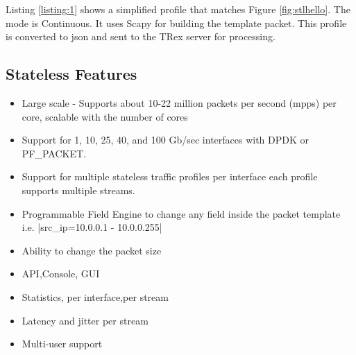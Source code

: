 \documentclass[letterpaper]{article}
\begin{document}
Listing \ref{listing:1} shows a simplified profile that matches Figure \ref{fig:stlhello}. The mode is Continuous. 
It uses Scapy for building the template packet. This profile is converted to json and sent to the TRex server for processing. 

  
\subsection{Stateless Features}

\begin{itemize}
\item Large scale - Supports about 10-22 million packets per second (mpps) per core, scalable with the number of cores
\item Support for 1, 10, 25, 40, and 100 Gb/sec interfaces with DPDK or PF\_PACKET.
\item Support for multiple stateless traffic profiles per interface each profile supports multiple streams. 
\item Programmable Field Engine to change any field inside the packet template i.e. |src_ip=10.0.0.1 - 10.0.0.255| 
\item Ability to change the packet size 
\item API,Console, GUI
\item Statistics, per interface,per stream 
\item Latency and jitter per stream
\item Multi-user support 
\end{itemize}
\end{document}
